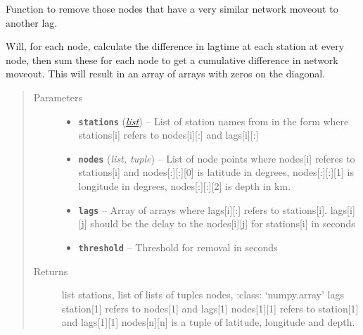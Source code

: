 \documentclass[a4paper,10pt,english]{sphinxmanual}
\begin{document}

\begin{fulllineitems}
\label{core:bright_lights._rm_similarlags}
Function to remove those nodes that have a very similar network moveout
to another lag.

Will, for each node, calculate the difference in lagtime at each station
at every node, then sum these for each node to get a cumulative difference
in network moveout.  This will result in an array of arrays with zeros on
the diagonal.
\begin{quote}\begin{description}
\item[{Parameters}] \leavevmode\begin{itemize}
\item {} 
\textbf{\texttt{stations}} (\href{https://docs.python.org/library/functions.html\#list}{\emph{list}}) -- List of station names from in the form where stations{[}i{]}    refers to nodes{[}i{]}{[}:{]} and lags{[}i{]}{[}:{]}

\item {} 
\textbf{\texttt{nodes}} (\emph{list, tuple}) -- List of node points where nodes{[}i{]} referes to stations{[}i{]} and    nodes{[}:{]}{[}:{]}{[}0{]} is latitude in degrees, nodes{[}:{]}{[}:{]}{[}1{]} is longitude in    degrees, nodes{[}:{]}{[}:{]}{[}2{]} is depth in km.

\item {} 
\textbf{\texttt{lags}} -- Array of arrays where lags{[}i{]}{[}:{]} refers to stations{[}i{]}.    lags{[}i{]}{[}j{]} should be the delay to the nodes{[}i{]}{[}j{]} for stations{[}i{]} in seconds

\item {} 
\textbf{\texttt{threshold}} -- Threshold for removal in seconds

\end{itemize}

\item[{Returns}] \leavevmode
list stations, list of lists of tuples nodes, :class:     `numpy.array' lags station{[}1{]} refers to nodes{[}1{]} and lags{[}1{]}    nodes{[}1{]}{[}1{]} refers to station{[}1{]} and lags{[}1{]}{[}1{]}    nodes{[}n{]}{[}n{]} is a tuple of latitude, longitude and depth.

\end{description}\end{quote}

\end{fulllineitems}
\end{document}

